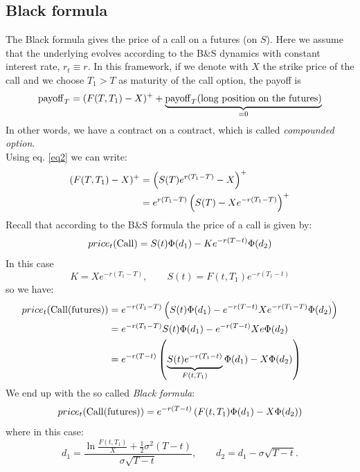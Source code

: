 \subsection{Black formula} %
The Black formula gives the price of a call on a futures (on $S$). Here we assume that the underlying evolves according to the B\&S dynamics with constant interest rate, $r_t \equiv r$. In this framework, if we denote with $X$ the strike price of the call and we choose $T_1 > T$ as maturity of the call option, the payoff is
\begin{equation}
    \operatorname{payoff}_T = (F(T,T_1) - X)^+ + \underbrace{\operatorname{payoff}_T(\text{long position on the futures})}_{=0}
\end{equation}
In other words, we have a contract on a contract, which is called \emph{compounded option}. \\
Using eq. \eqref{eq2} we can write:
\begin{align}
    \notag (F(T,T_1) - X)^+ &= \left(S(T)e^{r(T_1-T)} - X\right)^+ \\
    &=
    e^{r(T_1-T)}\left(S(T)-Xe^{-r(T_1-T)}\right)^+
\end{align}
Recall that according to the B\&S formula the price of a call is given by:
\begin{equation*}
    price_t(\operatorname{Call}) = S(t)\Phi(d_1)-Ke^{-r(T-t)}\Phi(d_2)
\end{equation*}
In this case
\begin{equation*}
    K = Xe^{-r(T_1-T)}, \qquad S(t) = F(t,T_1)e^{-r(T_1-t)}
\end{equation*}
so we have:
\begin{align*}
    price_t(\operatorname{Call}(\operatorname{futures})) &= e^{-r(T_1-T)} \left(S(t)\Phi(d_1)-e^{-r(T-t)}Xe^{-r(T_1-T)}\Phi(d_2)\right) \\
    &=
    e^{-r(T_1-T)}S(t)\Phi(d_1)-e^{-r(T-t)}Xe\Phi(d_2) \\
    &=
    e^{-r(T-t)}\left(\underbrace{S(t)e^{-r(T_1-t)}}_{F(t,T_1)}\Phi(d_1) - X\Phi(d_2)\right)
\end{align*}
We end up with the so called \emph{Black formula}:
\begin{equation}
    price_t(\operatorname{Call}(\operatorname{futures})) = e^{-r(T-t)}\left(F(t,T_1)\Phi(d_1) - X\Phi(d_2)\right)
\end{equation}
where in this case:
\begin{equation}
    d_1 = \dfrac{\ln\frac{F(t,T_1)}{X}+\frac{1}{2}\sigma^2(T-t)}{\sigma\sqrt{T-t}}, \qquad d_2 = d_1 - \sigma\sqrt{T-t}. %
\end{equation}
